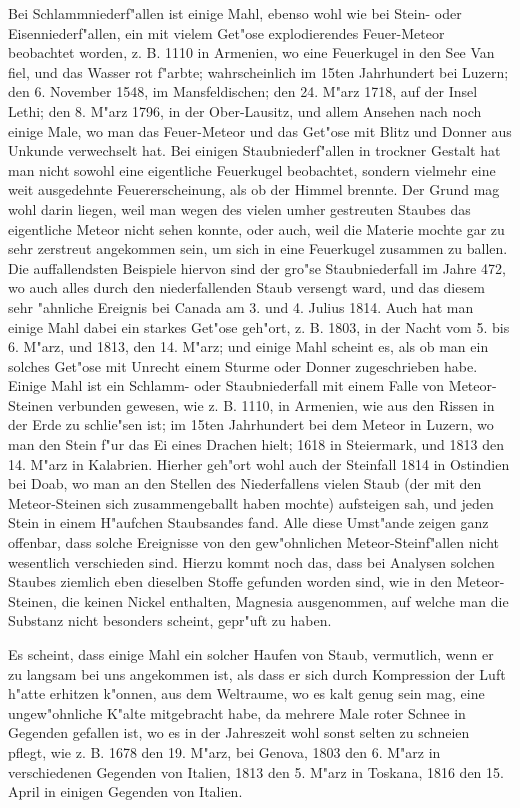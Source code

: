\documentclass[a4paper, 11pt, oneside, polutonikogreek, german]{article}
\begin{document}
Bei Schlammniederf"allen ist einige Mahl, ebenso wohl wie bei Stein- oder Eisenniederf"allen, ein mit vielem Get"ose explodierendes Feuer-Meteor beobachtet worden, z. B. 1110 in Armenien, wo eine Feuerkugel in den See Van fiel, und das Wasser rot f"arbte; wahrscheinlich im 15ten Jahrhundert bei Luzern; den 6. November 1548, im Mansfeldischen; den 24. M"arz 1718, auf der Insel Lethi; den 8. M"arz 1796, in der Ober-Lausitz, und allem Ansehen nach noch einige Male, wo man das Feuer-Meteor und das Get"ose mit Blitz und Donner aus Unkunde verwechselt hat. Bei einigen Staubniederf"allen in trockner Gestalt hat man nicht sowohl eine eigentliche Feuerkugel beobachtet, sondern vielmehr eine weit ausgedehnte Feuererscheinung, als ob der Himmel brennte. Der Grund mag wohl darin liegen, weil man wegen des vielen umher gestreuten Staubes das eigentliche Meteor nicht sehen konnte, oder auch, weil die Materie mochte gar zu sehr zerstreut angekommen sein, um sich in eine Feuerkugel zusammen zu ballen. Die auffallendsten Beispiele hiervon sind der gro"se Staubniederfall im Jahre 472, wo auch alles durch den niederfallenden Staub versengt ward, und das diesem sehr "ahnliche Ereignis bei Canada am 3. und 4. Julius 1814. Auch hat man einige Mahl dabei ein starkes Get"ose geh"ort, z. B. 1803, in der Nacht vom 5. bis 6. M"arz, und 1813, den 14. M"arz; und einige Mahl scheint es, als ob man ein solches Get"ose mit Unrecht einem Sturme oder Donner zugeschrieben habe. Einige Mahl ist ein Schlamm- oder Staubniederfall mit einem Falle von Meteor-Steinen verbunden gewesen, wie z. B. 1110, in Armenien, wie aus den Rissen in der Erde zu schlie"sen ist; im 15ten Jahrhundert bei dem Meteor in Luzern, wo man den Stein f"ur das Ei eines Drachen hielt; 1618 in Steiermark, und 1813 den 14. M"arz in Kalabrien. Hierher geh"ort wohl auch der Steinfall 1814 in Ostindien bei Doab, wo man an den Stellen des Niederfallens vielen Staub (der mit den Meteor-Steinen sich zusammengeballt haben mochte) aufsteigen sah, und jeden Stein in einem H"aufchen Staubsandes fand. Alle diese Umst"ande zeigen ganz offenbar, dass solche Ereignisse von den gew"ohnlichen Meteor-Steinf"allen nicht wesentlich verschieden sind. Hierzu kommt noch das, dass bei Analysen solchen Staubes ziemlich eben dieselben Stoffe gefunden worden sind, wie in den Meteor-Steinen, die keinen Nickel enthalten, Magnesia ausgenommen, auf welche man die Substanz nicht besonders scheint, gepr"uft zu haben.

Es scheint, dass einige Mahl ein solcher Haufen von Staub, vermutlich, wenn er zu langsam bei uns angekommen ist, als dass er sich durch Kompression der Luft h"atte erhitzen k"onnen, aus dem Weltraume, wo es kalt genug sein mag, eine ungew"ohnliche K"alte mitgebracht habe, da mehrere Male roter Schnee in Gegenden gefallen ist, wo es in der Jahreszeit wohl sonst selten zu schneien pflegt, wie z. B. 1678 den 19. M"arz, bei Genova, 1803 den 6. M"arz in verschiedenen Gegenden von Italien, 1813 den 5. M"arz in Toskana, 1816 den 15. April in einigen Gegenden von Italien.
\end{document}
